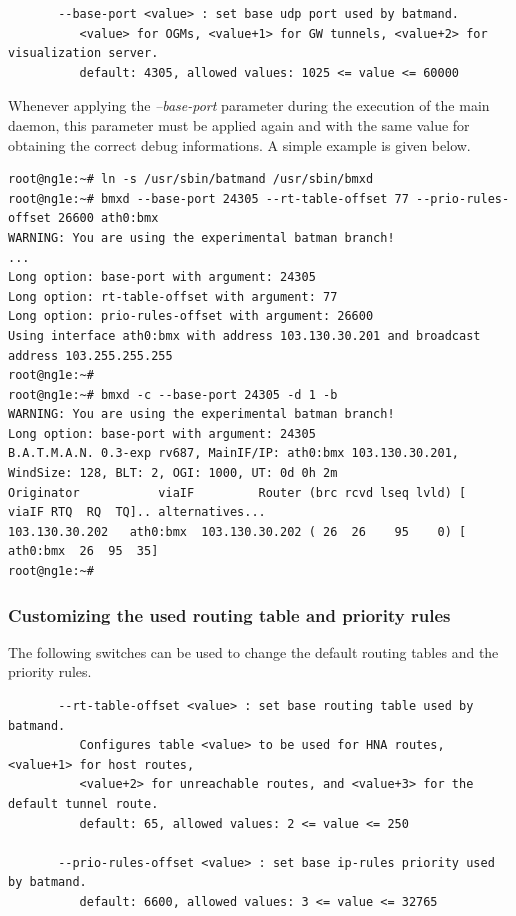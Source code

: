 \documentclass[11pt]{article}
\begin{document}
\begin{small} \begin{verbatim}
       --base-port <value> : set base udp port used by batmand.
          <value> for OGMs, <value+1> for GW tunnels, <value+2> for visualization server.
          default: 4305, allowed values: 1025 <= value <= 60000
\end{verbatim} \end{small}

Whenever applying the \emph{--base-port} parameter during the execution of the main daemon, this parameter must be applied again and with the same value for obtaining the correct debug informations. A simple example is given below.

\begin{small} \begin{verbatim}
root@ng1e:~# ln -s /usr/sbin/batmand /usr/sbin/bmxd
root@ng1e:~# bmxd --base-port 24305 --rt-table-offset 77 --prio-rules-offset 26600 ath0:bmx
WARNING: You are using the experimental batman branch!
...
Long option: base-port with argument: 24305
Long option: rt-table-offset with argument: 77
Long option: prio-rules-offset with argument: 26600
Using interface ath0:bmx with address 103.130.30.201 and broadcast address 103.255.255.255
root@ng1e:~#
root@ng1e:~# bmxd -c --base-port 24305 -d 1 -b
WARNING: You are using the experimental batman branch!
Long option: base-port with argument: 24305
B.A.T.M.A.N. 0.3-exp rv687, MainIF/IP: ath0:bmx 103.130.30.201, WindSize: 128, BLT: 2, OGI: 1000, UT: 0d 0h 2m
Originator           viaIF         Router (brc rcvd lseq lvld) [    viaIF RTQ  RQ  TQ].. alternatives...
103.130.30.202   ath0:bmx  103.130.30.202 ( 26  26    95    0) [ ath0:bmx  26  95  35]
root@ng1e:~#

\end{verbatim} \end{small}

\subsubsection{Customizing the used routing table and priority rules}

The following switches can be used to change the default routing tables and the priority rules.

\begin{small} \begin{verbatim}
       --rt-table-offset <value> : set base routing table used by batmand.
          Configures table <value> to be used for HNA routes, <value+1> for host routes,
          <value+2> for unreachable routes, and <value+3> for the default tunnel route.
          default: 65, allowed values: 2 <= value <= 250

       --prio-rules-offset <value> : set base ip-rules priority used by batmand.
          default: 6600, allowed values: 3 <= value <= 32765
\end{verbatim} \end{small}
\end{document}

